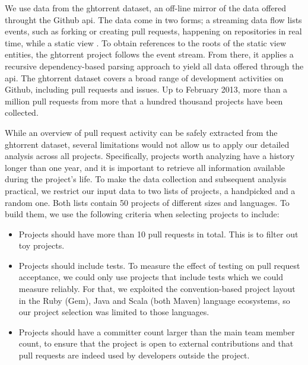 \documentclass{acm_proc_article-sp}
\begin{document}
We use data from the {\sc ght}orrent dataset, an off-line mirror of the data
offered throught the Github {\sc api}. The data come in two forms; a streaming
data flow lists events, such as forking or creating pull requests, happening on
repositories in real time, while a static view . To obtain references to the
roots of the static view entities, the {\sc ght}orrent project follows the event
stream. From there, it applies a recursive dependency-based parsing approach to
yield all data offered through the {\sc api}. The {\sc ght}orrent dataset covers
a broad range of development activities on Github, including pull requests and
issues. Up to February 2013, more than a million pull requests from more that a
hundred thousand projects have been collected.

While an overview of pull request activity can be safely extracted from the {\sc
ght}orrent dataset, several limitations would not allow us to apply our detailed
analysis across all projects. Specifically, projects worth analyzing have a
history longer than one year, and it is important to retrieve all information
available during the project's life. To make the data collection and subsequent
analysis practical, we restrict our input data to two lists of projects, a
\textsf{handpicked} and a \textsf{random} one. Both lists contain 50 projects
of different sizes and languages. To build them, we use the following
criteria when selecting projects to include:

\begin{itemize}

  \item Projects should have more than 10 pull requests in total. This is
    to filter out toy projects. 

  \item Projects should include tests. To measure the effect of testing on pull
    request acceptance, we could only use projects that include tests which we
    could measure reliably. For that, we exploited the convention-based project
    layout in the Ruby (Gem), Java and Scala (both Maven) language ecosystems,
    so our project selection was limited to those languages. 

  \item Projects should have a committer count larger than the main team member
    count, to ensure that the project is open to external contributions and that
    pull requests are indeed used by developers outside the project.

\end{itemize}
\end{document}
